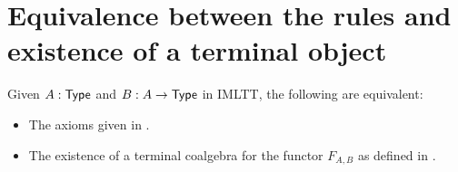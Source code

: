 \documentclass[envcountsame]{llncs}
\begin{document}



\section{Equivalence between the rules and existence of a terminal object}

\begin{lemma}
  Given $A:\mathsf{Type}$ and $B:A\to\mathsf{Type}$ in IMLTT, the following are equivalent:
 \begin{itemize}
  \item The axioms given in .
  \item The existence of a terminal coalgebra for the functor $F_{A,B}$ as defined in .
 \end{itemize}

\end{lemma}

 
\printbibliography


\appendix
\end{document}
